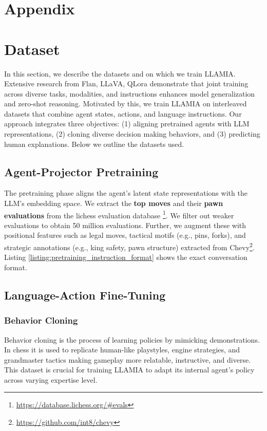 \documentclass{article}
\theoremstyle{plain}
\theoremstyle{definition}
\theoremstyle{remark}
\begin{document}
\section*{Appendix}
\section{Dataset}
\label{app:data_stats}
\vspace{-2mm}
In this section, we describe the datasets and on which we train LLAMIA. Extensive research from Flan, LLaVA, QLora \cite{longpre2023flan,dettmers2024qlora,liu2024improved,liu2023visual} demonstrate that joint training across diverse tasks, modalities, and instructions enhances model generalization and zero-shot reasoning. Motivated by this, we train LLAMIA on interleaved datasets that combine agent states, actions, and language instructions. Our approach integrates three objectives: (1) aligning pretrained agents with LLM representations, (2) cloning diverse decision making behaviors, and (3) predicting human explanations. Below we outline the datasets used.

\subsection{Agent-Projector Pretraining}
The pretraining phase aligns the agent’s latent state representations with the LLM’s embedding space. We extract the \textbf{top moves} and their \textbf{pawn evaluations} from the lichess evaluation database \footnote{\url{https://database.lichess.org/\#evals}}. We filter out weaker evaluations to obtain 50 million evaluations. Further, we augment these with positional features such as legal moves, tactical motifs (e.g., pins, forks), and strategic annotations (e.g., king safety, pawn structure) extracted from Chevy\footnote{\url{https://github.com/int8/chevy}}. Listing \ref{listing:pretraining_instruction_format} shows the exact conversation format.

\subsection{Language-Action Fine-Tuning}
\label{subsec:language_action }
\subsubsection{Behavior Cloning}
Behavior cloning is the process of learning policies by mimicking demonstrations. In chess it is used to replicate human-like playstyles, engine strategies, and grandmaster tactics making gameplay more relatable, instructive, and diverse. This dataset is crucial for training LLAMIA to adapt its internal agent’s policy across varying expertise level.
\end{document}
